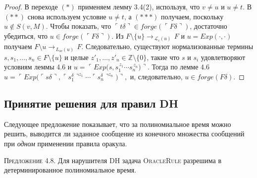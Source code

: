 \begin{proof}
В переходе $(*)$ применяем лемму 3.4(2), используя, что $v\ne u$ и $u\ne t$.
В $(**)$ снова используем условие $u\ne t$,
а $(***)$ получаем, поскольку $u\notin S(v,M)$.
Чтобы показать, что $\ulcorner t\delta \urcorner \in forge(\ulcorner F\delta\urcorner)$,
достаточно убедиться, что $u\in forge(\ulcorner F\delta\urcorner)$.
Из $F\setminus\{u\}\rightarrow_{\,\mathcal L_{c}(u)\,}F$
и $u=Exp(\cdot,\cdot)$
получаем $F\!\setminus\!u\rightarrow_{\,L_{oc}(u)\,}F$.
Следовательно, существуют нормализованные термины
$s,s_{1},\dots,s_{n}\in F\setminus\{u\}$
и целые $z'_{1},\dots,z'_{n}\in\mathbb Z\setminus\{0\}$,
такие что $s$ и $s_{i}$ удовлетворяют условиям леммы 4.6
и
\(
  u=\ulcorner Exp\!\bigl(s,s_{1}^{\,z_{1}}\!\cdots s_{n}^{\,z_{n}}\bigr)\urcorner .
\)
Тогда по лемме 4.6
\(
  u=\ulcorner Exp\!\bigl(\ulcorner s\delta \urcorner,
        \ulcorner s_{1}^{\delta}\urcorner^{z_{1}}\!\cdots\ulcorner s_{n}^{\delta}\urcorner^{z_{n}}\bigr)\urcorner,
\)
и, следовательно,
$u\in forge(F\delta)$.
\end{proof}

\subsection{Принятие решения для правил DH}

Следующее предложение показывает, что за полиномиальное время
можно решить, выводится ли заданное сообщение из конечного множества
сообщений при \emph{одном} применении правила оракула.

\textsc{Предложение 4.8.}
Для нарушителя DH задача \textsc{OracleRule}
разрешима в детерминированное полиномиальное время.

